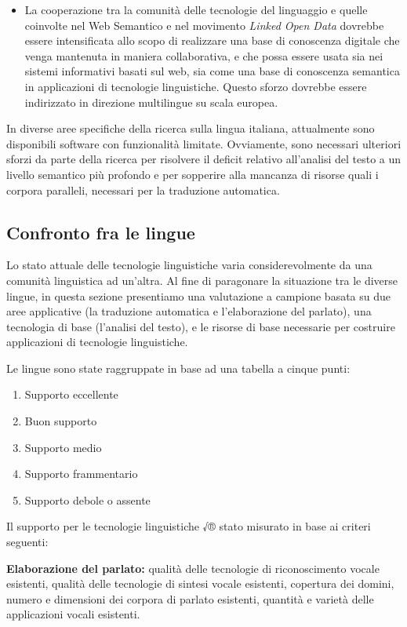 \begin{multicols}{2}
\begin{itemize}
\item La cooperazione tra la comunit\`{a} delle tecnologie del linguaggio e quelle coinvolte nel Web Semantico e nel movimento \textit{Linked Open Data} dovrebbe essere intensificata allo scopo di realizzare una base di conoscenza digitale che venga mantenuta in maniera collaborativa, e che possa essere usata sia nei sistemi informativi basati sul web, sia come una base di conoscenza semantica in applicazioni di tecnologie linguistiche. Questo sforzo dovrebbe essere indirizzato in direzione multilingue su scala europea.
\end{itemize}

In diverse aree specifiche della ricerca sulla lingua italiana, attualmente sono disponibili software con funzionalit\`{a} limitate. Ovviamente, sono necessari ulteriori sforzi da parte della ricerca per risolvere il deficit relativo all'analisi del testo a un livello semantico pi\`{u} profondo e per sopperire alla mancanza di risorse quali i corpora paralleli, necessari per la traduzione automatica.

\subsection{Confronto fra le lingue}

Lo stato attuale delle tecnologie linguistiche varia considerevolmente da una
comunit\`{a} linguistica ad un'altra. Al fine di paragonare la situazione tra
le diverse lingue, in questa sezione presentiamo una valutazione a campione
basata su due aree applicative (la traduzione automatica e l'elaborazione del
parlato), una tecnologia di base (l'analisi del testo), e le risorse di base
necessarie per costruire applicazioni di tecnologie linguistiche.

Le lingue sono state raggruppate in base ad una tabella a cinque punti:

\begin{enumerate}
\item Supporto eccellente
\item Buon supporto
\item Supporto medio
\item Supporto frammentario
\item Supporto debole o assente
\end{enumerate}

Il supporto per le tecnologie linguistiche √® stato misurato in base ai criteri seguenti:

\textbf{Elaborazione del parlato:} qualit\`{a} delle tecnologie di riconoscimento vocale esistenti, qualit\`{a} delle tecnologie
di sintesi vocale esistenti, copertura dei domini, numero e dimensioni dei corpora di parlato esistenti, quantit\`{a} e variet\`{a}
 delle applicazioni vocali esistenti.


\end{multicols}
